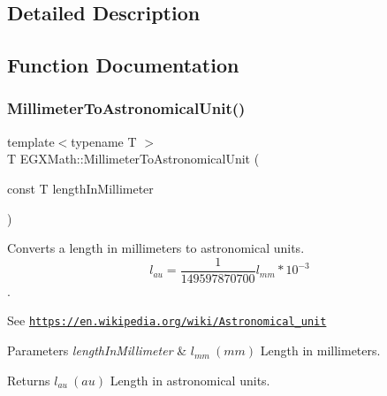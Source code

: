 \subsection{Detailed Description}


\subsection{Function Documentation}
\mbox{\label{group___e_g_x_math-_conversions-_length_conversions-_s_i-_millimeter-_astronomical_ga1ebdde429def9d2f19771a8847f9cfb5}} 
\subsubsection{\texorpdfstring{Millimeter\+To\+Astronomical\+Unit()}{MillimeterToAstronomicalUnit()}}
{\footnotesize\ttfamily template$<$typename T $>$ \\
T E\+G\+X\+Math\+::\+Millimeter\+To\+Astronomical\+Unit (\begin{DoxyParamCaption}\item[{const T}]{length\+In\+Millimeter }\end{DoxyParamCaption})}



Converts a length in millimeters to astronomical units. \[ l_{au}= \frac{1}{149597870700} l_{mm} * 10^{-3} \]. 

See \href{https://en.wikipedia.org/wiki/Astronomical_unit}{\tt https\+://en.\+wikipedia.\+org/wiki/\+Astronomical\+\_\+unit} 
\begin{DoxyParams}{Parameters}
{\em length\+In\+Millimeter} & $ l_{mm}\ (mm)$ Length in millimeters. \\
\hline
\end{DoxyParams}
\begin{DoxyReturn}{Returns}
$ l_{au}\ (au)$ Length in astronomical units. 
\end{DoxyReturn}
\mbox{\label{group___e_g_x_math-_conversions-_length_conversions-_s_i-_millimeter-_astronomical_gaca60b964c53d123506847dd98ba8a00b}} 
